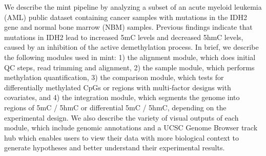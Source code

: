 We describe the mint pipeline by analyzing a subset of an acute myeloid leukemia (AML) public dataset containing cancer samples with mutations in the IDH2 gene and normal bone marrow (NBM) samples. Previous findings indicate that mutations in IDH2 lead to increased 5mC levels and decreased 5hmC levels, caused by an inhibition of the active demethylation process. In brief, we describe the following modules used in mint: 1) the alignment module, which does initial QC steps, read trimming and alignment, 2) the sample module, which performs methylation quantification, 3) the comparison module, which tests for differentially methylated CpGs or regions with multi-factor designs with covariates, and 4) the integration module, which segments the genome into regions of 5mC / 5hmC or differential 5mC / 5hmC, depending on the experimental design. We also describe the variety of visual outputs of each module, which include genomic annotations and a UCSC Genome Browser track hub which enables users to view their data with more biological context to generate hypotheses and better understand their experimental results.
